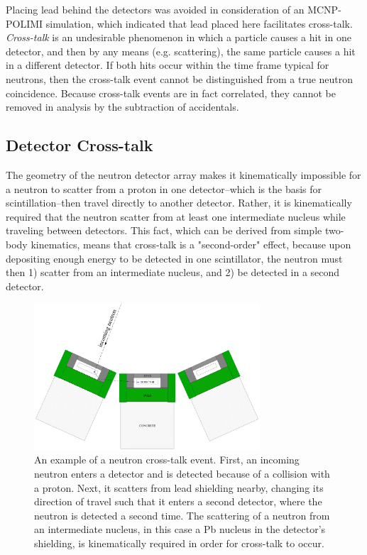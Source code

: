 Placing lead behind the detectors was avoided in consideration of an MCNP-POLIMI simulation, which indicated that lead placed here facilitates cross-talk. \textit{Cross-talk} is an undesirable phenomenon in which a particle causes a hit in one detector, and then by any means (e.g.  scattering), the same particle causes a hit in a different detector.
If both hits occur within the time frame typical for neutrons, then the cross-talk event cannot be distinguished from a true neutron coincidence.
Because cross-talk events are in fact correlated, they cannot be removed in analysis by the subtraction of accidentals.

\subsection{Detector Cross-talk}
The geometry of the neutron detector array makes it kinematically impossible for a neutron to scatter from a proton in one detector--which is the basis for scintillation--then travel directly to another detector.
Rather, it is kinematically required that the neutron scatter from at least one intermediate nucleus while traveling between detectors.
This fact, which can be derived from simple two-body kinematics, means that cross-talk is a "second-order" effect, because upon depositing enough energy to be detected in one scintillator, the neutron must then 1) scatter from an intermediate nucleus, and 2) be detected in a second detector.
\begin{figure}
    \centering
    \includegraphics[width = 0.75\textwidth]{Content/Methods/CrossTalkExample.png}
    \caption{An example of a neutron cross-talk event.
First, an incoming neutron enters a detector and is detected because of a collision with a proton.
Next, it scatters from lead shielding nearby, changing its direction of travel such that it enters a second detector, where the neutron is detected a second time.
The scattering of a neutron from an intermediate nucleus, in this case a Pb nucleus in the detector's shielding, is kinematically required in order for cross-talk to occur.}
    \label{fig:CrossTalkExamplepng}
\end{figure}
